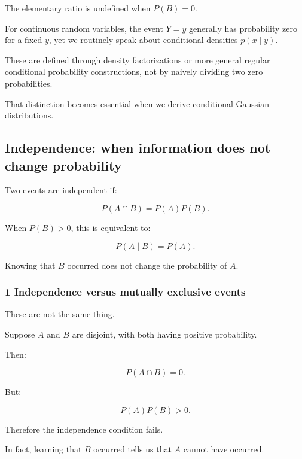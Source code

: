 The elementary ratio is undefined when \(P(B)=0\).

For continuous random variables, the event \(Y=y\) generally has probability zero for a fixed \(y\), yet we routinely speak about conditional densities \(p(x\mid y)\).

These are defined through density factorizations or more general regular conditional probability constructions, not by naively dividing two zero probabilities.

That distinction becomes essential when we derive conditional Gaussian distributions.

\subsection{Independence: when information does not change probability}\label{02-foundations-ii-ch023-independence-when-information-does-not-change-probability}

\hypertarget{02-foundations-ii-ch023-independence-when-information-does-not-change-probability}{}

Two events are independent if:

\[
 \boxed{ P(A\cap B)=P(A)P(B) }.
\]

When \(P(B)>0\), this is equivalent to:

\[
 P(A\mid B)=P(A).
\]

Knowing that \(B\) occurred does not change the probability of \(A\).

\subsubsection{1 Independence versus mutually exclusive events}\label{02-foundations-ii-ch023-independence-versus-mutually-exclusive-events}

\hypertarget{02-foundations-ii-ch023-independence-versus-mutually-exclusive-events}{}

These are not the same thing.

Suppose \(A\) and \(B\) are disjoint, with both having positive probability.

Then:

\[
 P(A\cap B)=0.
\]

But:

\[
 P(A)P(B)>0.
\]

Therefore the independence condition fails.

In fact, learning that \(B\) occurred tells us that \(A\) cannot have occurred.

